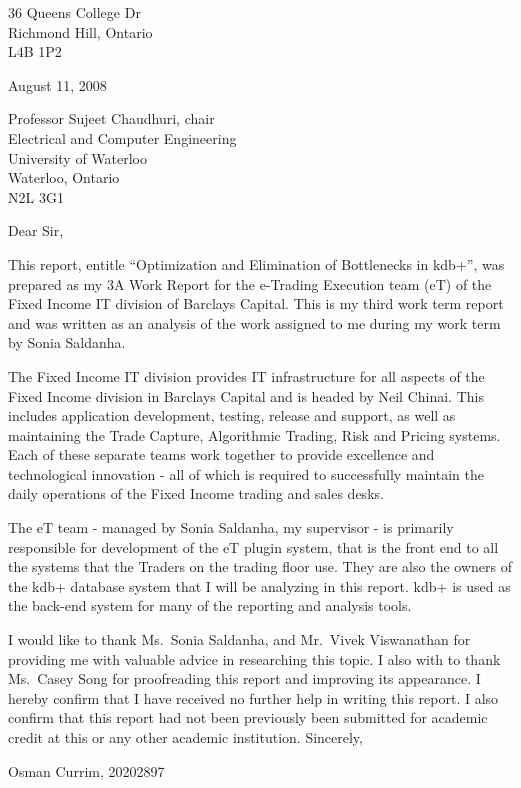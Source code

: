 \begin{titlepage} \raggedright
36 Queens College Dr\\
Richmond Hill, Ontario\\
L4B 1P2\newline

August 11, 2008\newline

Professor Sujeet Chaudhuri, chair\\
Electrical and Computer Engineering\\
University of Waterloo\\
Waterloo, Ontario\\
N2L 3G1\newline

Dear Sir,\newline

This report, entitle ``Optimization and Elimination of Bottlenecks in kdb+'', was prepared as my 3A Work Report for the e-Trading Execution team (eT) of the Fixed Income IT division of Barclays Capital. This is my third work term report and was written as an analysis of the work assigned to me during my work term by Sonia Saldanha.\newline

The Fixed Income IT division provides IT infrastructure for all aspects of the Fixed Income division in Barclays Capital and is headed by Neil Chinai. This includes application development, testing, release and support, as well as maintaining the Trade Capture, Algorithmic Trading, Risk and Pricing systems.  Each of these separate teams work together to provide excellence and technological innovation - all of which is required to successfully maintain the daily operations of the Fixed Income trading and sales desks.\newline

The eT team - managed by Sonia Saldanha, my supervisor - is primarily responsible for development of the eT plugin system, that is the front end to all the systems that the Traders on the trading floor use.  They are also the owners of the kdb+ database system that I will be analyzing in this report.  kdb+ is used as the back-end system for many of the reporting and analysis tools.\newline

I would like to thank Ms.\ Sonia Saldanha, and Mr.\ Vivek Viswanathan for providing me with valuable advice in researching this topic.  I also with to thank Ms.\ Casey Song for proofreading this report and improving its appearance. I hereby confirm that I have received no further help in writing this report.  I also confirm that this report had not been previously been submitted for academic credit at this or any other academic institution.\newline
\vfill
Sincerely,\newline

Osman Currim, 20202897
\end{titlepage}